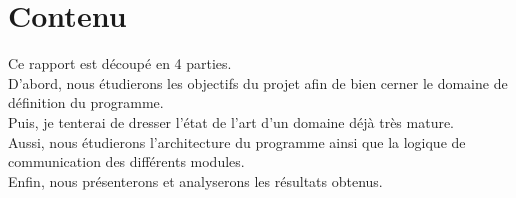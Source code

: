 \section{Contenu}
Ce rapport est découpé en 4 parties.\\

D'abord, nous étudierons les objectifs du projet afin de bien cerner le
domaine de définition du programme.\\

Puis, je tenterai de dresser l'état de l'art d'un domaine déjà très
mature.\\

Aussi, nous étudierons l'architecture du programme ainsi que la logique de
communication des différents modules.\\

Enfin, nous présenterons et analyserons les résultats obtenus.
